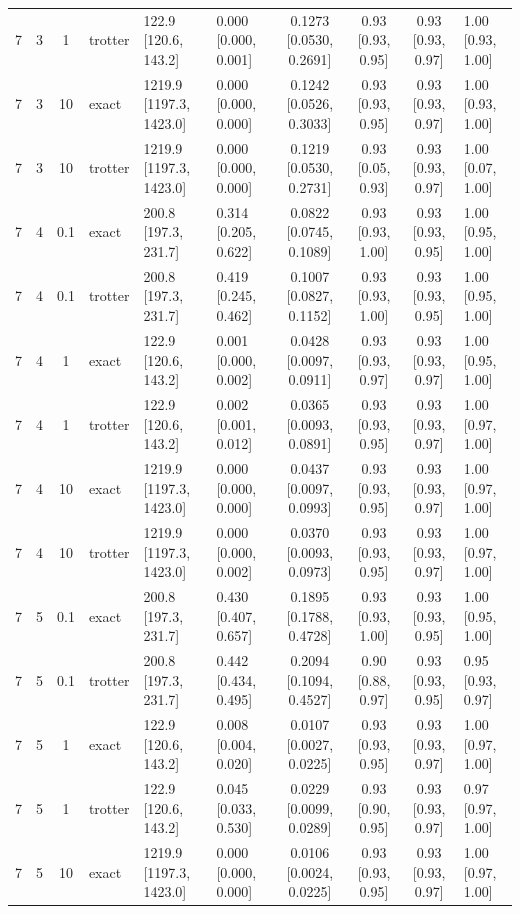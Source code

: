 \begin{tabular}{ccclllccc}
7 & 3 & 1 & trotter & 122.9 [120.6, 143.2] & 0.000 [0.000, 0.001] & 0.1273 [0.0530, 0.2691] & 0.93 [0.93, 0.95] & 0.93 [0.93, 0.97] & 1.00 [0.93, 1.00] \\
7 & 3 & 10 & exact & 1219.9 [1197.3, 1423.0] & 0.000 [0.000, 0.000] & 0.1242 [0.0526, 0.3033] & 0.93 [0.93, 0.95] & 0.93 [0.93, 0.97] & 1.00 [0.93, 1.00] \\
7 & 3 & 10 & trotter & 1219.9 [1197.3, 1423.0] & 0.000 [0.000, 0.000] & 0.1219 [0.0530, 0.2731] & 0.93 [0.05, 0.93] & 0.93 [0.93, 0.97] & 1.00 [0.07, 1.00] \\
7 & 4 & 0.1 & exact & 200.8 [197.3, 231.7] & 0.314 [0.205, 0.622] & 0.0822 [0.0745, 0.1089] & 0.93 [0.93, 1.00] & 0.93 [0.93, 0.95] & 1.00 [0.95, 1.00] \\
7 & 4 & 0.1 & trotter & 200.8 [197.3, 231.7] & 0.419 [0.245, 0.462] & 0.1007 [0.0827, 0.1152] & 0.93 [0.93, 1.00] & 0.93 [0.93, 0.95] & 1.00 [0.95, 1.00] \\
7 & 4 & 1 & exact & 122.9 [120.6, 143.2] & 0.001 [0.000, 0.002] & 0.0428 [0.0097, 0.0911] & 0.93 [0.93, 0.97] & 0.93 [0.93, 0.97] & 1.00 [0.95, 1.00] \\
7 & 4 & 1 & trotter & 122.9 [120.6, 143.2] & 0.002 [0.001, 0.012] & 0.0365 [0.0093, 0.0891] & 0.93 [0.93, 0.95] & 0.93 [0.93, 0.97] & 1.00 [0.97, 1.00] \\
7 & 4 & 10 & exact & 1219.9 [1197.3, 1423.0] & 0.000 [0.000, 0.000] & 0.0437 [0.0097, 0.0993] & 0.93 [0.93, 0.95] & 0.93 [0.93, 0.97] & 1.00 [0.97, 1.00] \\
7 & 4 & 10 & trotter & 1219.9 [1197.3, 1423.0] & 0.000 [0.000, 0.002] & 0.0370 [0.0093, 0.0973] & 0.93 [0.93, 0.95] & 0.93 [0.93, 0.97] & 1.00 [0.97, 1.00] \\
7 & 5 & 0.1 & exact & 200.8 [197.3, 231.7] & 0.430 [0.407, 0.657] & 0.1895 [0.1788, 0.4728] & 0.93 [0.93, 1.00] & 0.93 [0.93, 0.95] & 1.00 [0.95, 1.00] \\
7 & 5 & 0.1 & trotter & 200.8 [197.3, 231.7] & 0.442 [0.434, 0.495] & 0.2094 [0.1094, 0.4527] & 0.90 [0.88, 0.97] & 0.93 [0.93, 0.95] & 0.95 [0.93, 0.97] \\
7 & 5 & 1 & exact & 122.9 [120.6, 143.2] & 0.008 [0.004, 0.020] & 0.0107 [0.0027, 0.0225] & 0.93 [0.93, 0.95] & 0.93 [0.93, 0.97] & 1.00 [0.97, 1.00] \\
7 & 5 & 1 & trotter & 122.9 [120.6, 143.2] & 0.045 [0.033, 0.530] & 0.0229 [0.0099, 0.0289] & 0.93 [0.90, 0.95] & 0.93 [0.93, 0.97] & 0.97 [0.97, 1.00] \\
7 & 5 & 10 & exact & 1219.9 [1197.3, 1423.0] & 0.000 [0.000, 0.000] & 0.0106 [0.0024, 0.0225] & 0.93 [0.93, 0.95] & 0.93 [0.93, 0.97] & 1.00 [0.97, 1.00] \\

\end{tabular}
